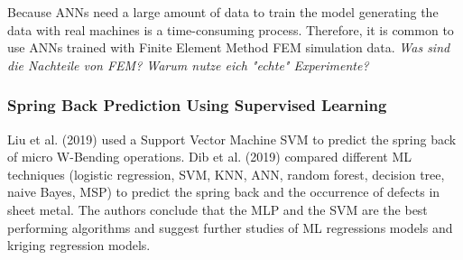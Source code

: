 Because \ac{ANN}s need a large amount of data to train the model generating the data with real
machines is a time-consuming process.
Therefore, it is common to use \ac{ANN}s trained with Finite Element Method \ac{FEM} simulation
data.
\textit{Was sind die Nachteile von FEM? Warum nutze eich "echte" Experimente?}

\subsubsection*{Spring Back Prediction Using Supervised Learning}
Liu et al. (2019) used a Support Vector Machine \ac{SVM} to predict the spring back of micro
W-Bending operations. \cite{liu_springbackpredictionforming_2019}
Dib et al. (2019) compared different \ac{ML} techniques (logistic regression, SVM, KNN, ANN,
random forest, decision tree, naive Bayes, MSP) to predict the spring back and the occurrence of
defects in sheet metal. \cite[p. 1]{dib_singleensembleclassifiers_2020}
The authors conclude that the MLP and the SVM are the best performing algorithms and suggest
further studies of ML regressions models and kriging regression models. \cite[p.
13]{dib_singleensembleclassifiers_2020}


